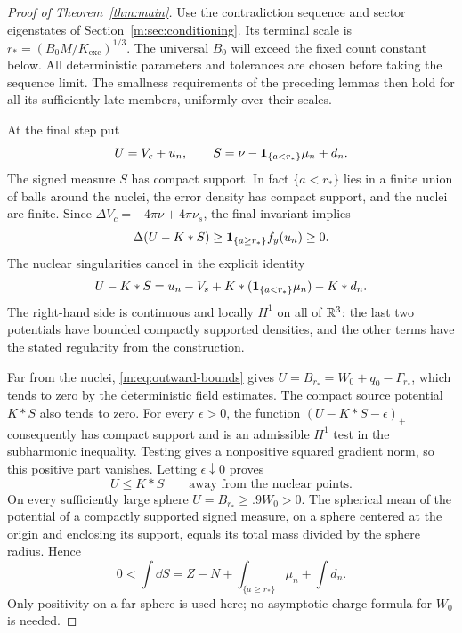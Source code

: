 \begin{proof}[Proof of Theorem~\ref{thm:main}]
Use the contradiction sequence and sector eigenstates of
Section~\ref{m:sec:conditioning}. Its terminal scale is
$r_*=(B_0M/K_{\mathrm{exc}})^{1/3}$. The universal $B_0$ will exceed
the fixed count constant below.  All deterministic parameters and tolerances
are chosen before taking the sequence limit.  The smallness requirements of
the preceding lemmas then hold for all its sufficiently late members,
uniformly over their scales.

At the final step put
\[
 U=V_c+u_n,\qquad
 S=\nu-\mathbf 1_{\{a<r_*\}}\mu_n+d_n.
\]
The signed measure $S$ has compact support.  In fact $\{a<r_*\}$ lies in a
finite union of balls around the nuclei, the error density has compact
support, and the nuclei are finite.  Since
$\Delta V_c=-4\pi\nu+4\pi\nu_s$, the final invariant implies
\[
 \Delta(U-K*S)\ge\mathbf 1_{\{a\ge r_*\}}f_y(u_n)\ge0.
\]
The nuclear singularities cancel in the explicit identity
\begin{equation}
\label{m:eq:outward-cancellation}
 U-K*S
   =u_n-V_s+K*(\mathbf 1_{\{a<r_*\}}\mu_n)-K*d_n.
\end{equation}
The right-hand side is continuous and locally $H^1$ on all of $\mathbb R^3$:
the last two potentials have bounded compactly supported densities, and the
other terms have the stated regularity from the construction.

Far from the nuclei, \eqref{m:eq:outward-bounds} gives
$U=B_{r_*}=W_0+q_0-\Gamma_{r_*}$, which tends to zero by the deterministic
field estimates.  The compact source potential $K*S$ also tends to zero.
For every $\epsilon>0$, the function $(U-K*S-\epsilon)_+$ consequently has
compact support and is an admissible $H^1$ test in the subharmonic
inequality.  Testing gives a nonpositive squared gradient norm, so this
positive part vanishes.  Letting $\epsilon\downarrow0$ proves
\[
 U\le K*S\qquad\text{away from the nuclear points}.
\]
On every sufficiently large sphere $U=B_{r_*}\ge .9W_0>0$.
The spherical mean of the potential of a compactly supported signed measure,
on a sphere centered at the origin and enclosing its support, equals its
total mass divided by the sphere radius.  Hence
\begin{equation}
\label{m:eq:outward-mass}
 0<\int\dd S
   =Z-N+\int_{\{a\ge r_*\}}\mu_n+\int d_n.
\end{equation}
Only positivity on a far sphere is used here; no asymptotic charge formula
for $W_0$ is needed.


\end{proof}
